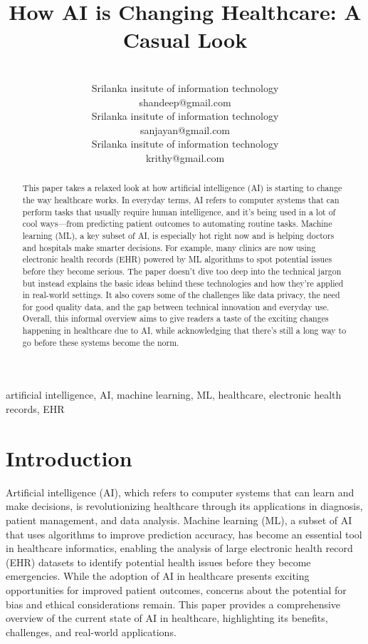 \documentclass[conference]{IEEEtran}
\title{How AI is Changing Healthcare: A Casual Look}
\author{
\begin{center}
\begin{tabular}{>{\centering\arraybackslash}p{0.3\linewidth} >{\centering\arraybackslash}p{0.3\linewidth} >{\centering\arraybackslash}p{0.3\linewidth}}

  
    
      \begin{minipage}[t]{\linewidth}
        \centering
        {\bfseries krish}\\
        Srilanka insitute of information technology\\
        shandeep@gmail.com
      \end{minipage}
       & 
    
      \begin{minipage}[t]{\linewidth}
        \centering
        {\bfseries sanjayan}\\
        Srilanka insitute of information technology\\
        sanjayan@gmail.com
      \end{minipage}
       & 
    
      \begin{minipage}[t]{\linewidth}
        \centering
        {\bfseries krith}\\
        Srilanka insitute of information technology\\
        krithy@gmail.com
      \end{minipage}
      
    
     \\
  

\end{tabular}
\end{center}
}
\begin{document}
\maketitle

\begin{abstract}
This paper takes a relaxed look at how artificial intelligence (AI) is starting to change the way healthcare works. In everyday terms, AI refers to computer systems that can perform tasks that usually require human intelligence, and it’s being used in a lot of cool ways—from predicting patient outcomes to automating routine tasks. Machine learning (ML), a key subset of AI, is especially hot right now and is helping doctors and hospitals make smarter decisions. For example, many clinics are now using electronic health records (EHR) powered by ML algorithms to spot potential issues before they become serious. The paper doesn’t dive too deep into the technical jargon but instead explains the basic ideas behind these technologies and how they’re applied in real-world settings. It also covers some of the challenges like data privacy, the need for good quality data, and the gap between technical innovation and everyday use. Overall, this informal overview aims to give readers a taste of the exciting changes happening in healthcare due to AI, while acknowledging that there’s still a long way to go before these systems become the norm.
\end{abstract}

\begin{IEEEkeywords}
artificial intelligence, AI, machine learning, ML, healthcare, electronic health records, EHR
\end{IEEEkeywords}




  \section{Introduction}
  Artificial intelligence (AI), which refers to computer systems that can learn and make decisions, is revolutionizing healthcare through its applications in diagnosis, patient management, and data analysis. Machine learning (ML), a subset of AI that uses algorithms to improve prediction accuracy, has become an essential tool in healthcare informatics, enabling the analysis of large electronic health record (EHR) datasets to identify potential health issues before they become emergencies. While the adoption of AI in healthcare presents exciting opportunities for improved patient outcomes, concerns about the potential for bias and ethical considerations remain. This paper provides a comprehensive overview of the current state of AI in healthcare, highlighting its benefits, challenges, and real-world applications.
\end{document}
